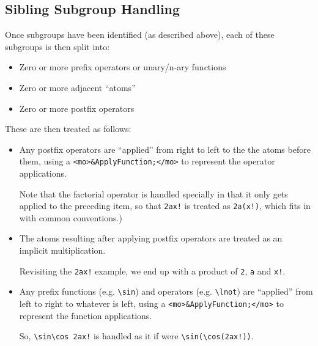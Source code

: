 \subsection*{Sibling Subgroup Handling}

Once subgroups have been identified (as described above), each of these
subgroups is then split into:

\begin{itemize}
\item Zero or more prefix operators or unary/n-ary functions
\item Zero or more adjacent ``atoms''
\item Zero or more postfix operators
\end{itemize}

These are then treated as follows:

\begin{itemize}

\item Any postfix operators are ``applied'' from right to left to the
the atoms before them, using a \verb|<mo>&ApplyFunction;</mo>| to represent the
operator applications.

Note that the factorial operator is handled specially in that it only
gets applied to the preceding item, so that \verb|2ax!| is treated as
\verb|2a(x!)|, which fits in with common conventions.)


\item The atoms resulting after applying postfix operators are treated as an
implicit multiplication.

Revisiting the \verb|2ax!| example, we end up with a product of \verb|2|,
\verb|a| and \verb|x!|.


\item Any prefix functions (e.g. \verb|\sin|) and operators
(e.g. \verb|\lnot|) are ``applied'' from left to right to
whatever is left, using a \verb|<mo>&ApplyFunction;</mo>| to represent the
function applications.

So, \verb|\sin\cos 2ax!| is handled as it if were \verb|\sin(\cos(2ax!))|.


\end{itemize}
